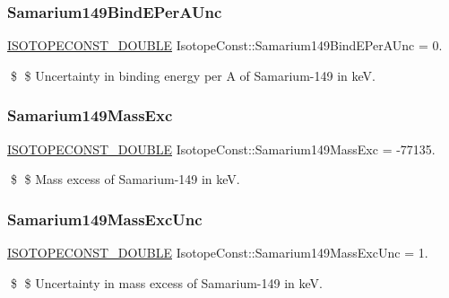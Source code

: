 \subsubsection{\texorpdfstring{Samarium149\+Bind\+E\+Per\+A\+Unc}{Samarium149BindEPerAUnc}}
{\footnotesize\ttfamily \mbox{\hyperlink{group___isotope_const-_macros_ga8f45a7272ce02c0b4c65c44636ed719a}{I\+S\+O\+T\+O\+P\+E\+C\+O\+N\+S\+T\+\_\+\+D\+O\+U\+B\+LE}} Isotope\+Const\+::\+Samarium149\+Bind\+E\+Per\+A\+Unc = 0.}

\$ \$ Uncertainty in binding energy per A of Samarium-\/149 in keV. \mbox{\label{group___isotope_const-_samarium-_sm149_ga61ee3b3dbe5b0d4c086078b143ebe007}} 
\subsubsection{\texorpdfstring{Samarium149\+Mass\+Exc}{Samarium149MassExc}}
{\footnotesize\ttfamily \mbox{\hyperlink{group___isotope_const-_macros_ga8f45a7272ce02c0b4c65c44636ed719a}{I\+S\+O\+T\+O\+P\+E\+C\+O\+N\+S\+T\+\_\+\+D\+O\+U\+B\+LE}} Isotope\+Const\+::\+Samarium149\+Mass\+Exc = -\/77135.}

\$ \$ Mass excess of Samarium-\/149 in keV. \mbox{\label{group___isotope_const-_samarium-_sm149_ga960393fc426656479d388f97e8a6b639}} 
\subsubsection{\texorpdfstring{Samarium149\+Mass\+Exc\+Unc}{Samarium149MassExcUnc}}
{\footnotesize\ttfamily \mbox{\hyperlink{group___isotope_const-_macros_ga8f45a7272ce02c0b4c65c44636ed719a}{I\+S\+O\+T\+O\+P\+E\+C\+O\+N\+S\+T\+\_\+\+D\+O\+U\+B\+LE}} Isotope\+Const\+::\+Samarium149\+Mass\+Exc\+Unc = 1.}

\$ \$ Uncertainty in mass excess of Samarium-\/149 in keV. \mbox{\label{group___isotope_const-_samarium-_sm149_gae3e0f6046e2276d7cdec9319f8175d47}} 
